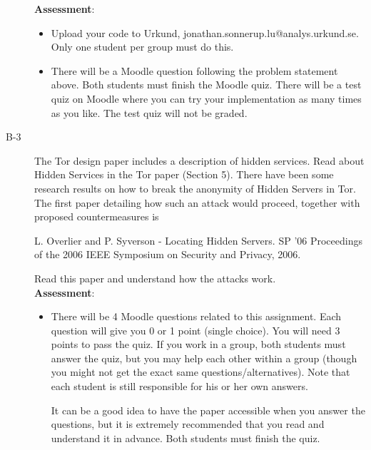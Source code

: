 \documentclass{article}
\begin{document}
\begin{description}
{		\textbf{Assessment}:
	\begin{itemize}
		\item Upload your code to Urkund, jonathan.sonnerup.lu@analys.urkund.se.  Only one student per group must do this.
		\item There will be a Moodle question following the problem statement above. Both students must finish the Moodle quiz. There will be	a test quiz on Moodle where you can try your implementation as many times as you like. The test quiz will not be graded.
	\end{itemize}
	}
	

	\item[B-3]{The Tor design paper includes a description of hidden services. Read about Hidden Services in the Tor paper (Section 5). 
		There have been some research results on how to break the anonymity of Hidden Servers in Tor. The first paper detailing how such an attack would proceed, together with proposed countermeasures is 
		\begin{center}
			\begin{minipage}{0.8\textwidth}
				L. Overlier and P. Syverson - Locating Hidden Servers. SP '06 Proceedings of the 2006 IEEE Symposium on Security and Privacy, 2006.
			\end{minipage}
		\end{center}
		Read this paper and understand how the attacks work.\\
	\textbf{Assessment}:
	\begin{itemize}
		\item There will be 4 Moodle questions related to this assignment. Each question will give you 0 or 1 point (single choice). You will need 3 points to pass the quiz.	If you work in a group, both students must answer the quiz, but you may help each other within a group (though you might not get the exact same questions/alternatives). Note that each student is still responsible for his or her own answers. 
		 
		It can be a good idea to have the paper accessible when you answer the questions, but it is extremely recommended that you read and understand it in advance. Both students must finish the quiz.
	\end{itemize}
	}	

	
	
\end{description}

\clearpage
\end{document}
